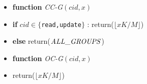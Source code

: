 \documentclass[conference]{IEEEtran}
\begin{document}
\vspace{1mm}
\begin{itemize}
\small
\itemsep0.08em
\item[] \hspace{-10mm}\textbf{function} \textit{CC-G}$(cid,x)$
\item[] \hspace{-3mm}\textbf{if} \texttt{$cid \in \{$read,update$\}$} : return($\lfloor xK/M \rfloor$)
\item[] \hspace{-3mm}\textbf{else} return($\it{ALL\_GROUPS}$)
\end{itemize}
\vspace{1mm}
\begin{itemize}
\small
\itemsep0.08em
\item[] \hspace{-10mm}\textbf{function} \textit{OC-G}$(cid, x)$
\item[] \hspace{-3mm}return($\lfloor xK/M \rfloor$)
\end{itemize}
\vspace{1mm}
\end{document}
